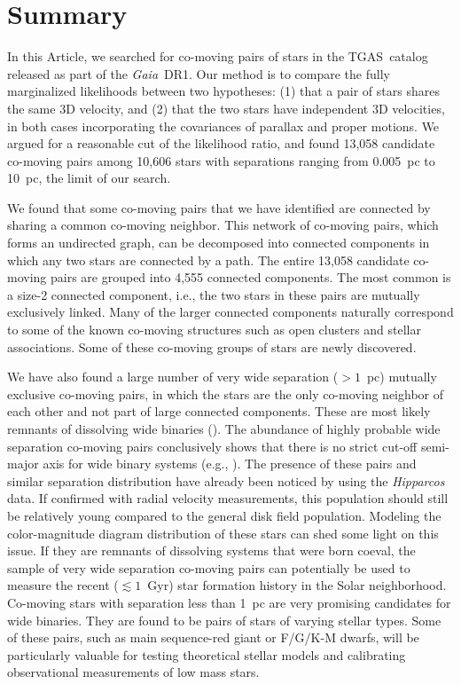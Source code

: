\documentclass[manuscript, letterpaper]{aastex6}
\newcommand{\project}[1]{\textsl{#1}}
\newcommand{\acronym}[1]{{\small{#1}}}
\newcommand{\gaia}{\project{Gaia}}
\newcommand{\documentname}{Article}
\newcommand{\tgas}{\acronym{TGAS}}
\begin{document}
\section{Summary}\label{sec:summary}

In this \documentname, we searched for co-moving pairs of stars in the
\tgas\ catalog released as part of the \gaia\ DR1.
Our method is to compare the fully marginalized likelihoods between two
hypotheses: (1) that a pair of
stars shares the same 3D velocity, and (2) that the two stars have independent
3D velocities, in both cases incorporating the covariances of parallax and
proper motions.
We argued for a reasonable cut of the likelihood ratio, and found
13,058 candidate co-moving pairs among 10,606 stars
with separations ranging from 0.005~pc to 10~pc, the limit of our search.

We found that some co-moving pairs that we have identified are connected
by sharing a common co-moving neighbor.
This network of co-moving pairs, which forms an undirected graph,
can be decomposed into connected components in which any two stars are connected
by a path.
The entire 13,058 candidate co-moving pairs are grouped into 4,555 connected
components. The most common is a size-2 connected component, i.e., the two
stars in these pairs are mutually exclusively linked.
Many of the larger connected components
naturally correspond to some of the known co-moving structures
such as open clusters and stellar associations.
Some of these co-moving groups of stars are newly discovered.

We have also found a large number of very wide separation ($>1$~pc)
mutually exclusive co-moving pairs, in which the stars are the only co-moving neighbor
of each other and not part of large connected components.
These are most likely remnants of dissolving wide binaries (\citealt{Jiang:2010aa}).
The abundance of highly probable wide separation co-moving pairs
conclusively shows that there is no strict cut-off semi-major axis for wide binary systems
(e.g., \citealt{Wasserman:1987aa}).
The presence of these pairs and similar separation distribution have already
been noticed by \citealt{Shaya:2011aa} using the \project{Hipparcos} data.
If confirmed with radial velocity measurements, this population should still be
relatively young compared to the general disk field population.
Modeling the color-magnitude diagram distribution of these stars can shed some
light on this issue.
If they are remnants of dissolving systems that were born coeval,
the sample of very wide separation co-moving pairs can potentially be used
to measure the recent ($\lesssim 1$~Gyr)
star formation history in the Solar neighborhood.
Co-moving stars with separation less than 1~pc are very promising candidates
for wide binaries. They are found to be pairs of stars of varying stellar types.
Some of these pairs, such as main sequence-red giant or F/G/K-M dwarfs,
will be particularly valuable for testing theoretical
stellar models and calibrating observational measurements of low mass stars.
\end{document}
